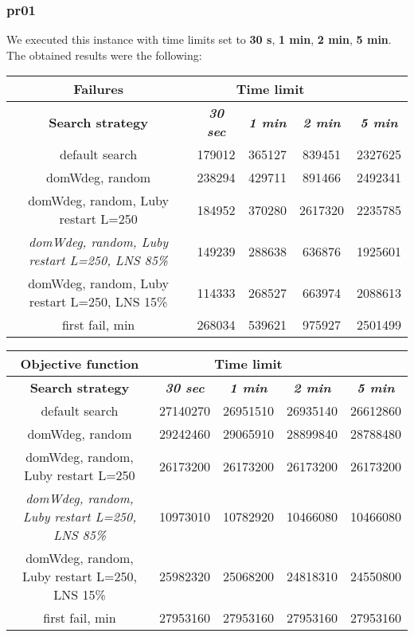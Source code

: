 \subsubsection{pr01}
We executed this instance with time limits set to \textbf{30 s}, \textbf{1 min}, \textbf{2 min}, \textbf{5 min}.\\
The obtained results were the following:
{
\renewcommand{\arraystretch}{2}
\begin{longtable}[h]{| c | c | c | c | c |}
    \hline
    \textbf{Failures} & \multicolumn{3}{c}{Time limit} & \\
    \hline
    \textbf{Search strategy} & \textbf{\textit{30 sec}} & \textbf{\textit{1 min}} & \textbf{\textit{2 min}} & \textbf{\textit{5 min}} \\
    \hline
    \endhead
    default search                                         & 179012 & 365127 &  839451 & 2327625 \\
    \hline
    domWdeg, random                                        & 238294 & 429711 &  891466 & 2492341 \\
    \hline
    domWdeg, random, Luby restart L=250                    & 184952 & 370280 & 2617320 & 2235785 \\
    \hline
    \textit{domWdeg, random, Luby restart L=250, LNS 85\%} & 149239 & 288638 &  636876 & 1925601 \\
    \hline
    domWdeg, random, Luby restart L=250, LNS 15\%          & 114333 & 268527 &  663974 & 2088613 \\
    \hline
    first fail, min                                        & 268034 & 539621 &  975927 & 2501499 \\
    \hline
\end{longtable}
}

{
\renewcommand{\arraystretch}{2}
\begin{longtable}[h]{| c | c | c | c | c |}
    \hline
    \textbf{Objective function} & \multicolumn{3}{c}{Time limit} & \\
    \hline
    \textbf{Search strategy} & \textbf{\textit{30 sec}} & \textbf{\textit{1 min}} & \textbf{\textit{2 min}} & \textbf{\textit{5 min}} \\
    \hline
    \endhead
    default search                                         & 27140270 & 26951510 & 26935140 & 26612860 \\
    \hline
    domWdeg, random                                        & 29242460 & 29065910 & 28899840 & 28788480 \\
    \hline
    domWdeg, random, Luby restart L=250                    & 26173200 & 26173200 & 26173200 & 26173200 \\
    \hline
    \textit{domWdeg, random, Luby restart L=250, LNS 85\%} & 10973010 & 10782920 & 10466080 & 10466080 \\
    \hline
    domWdeg, random, Luby restart L=250, LNS 15\%          & 25982320 & 25068200 & 24818310 & 24550800 \\
    \hline
    first fail, min                                        & 27953160 & 27953160 & 27953160 & 27953160 \\
    \hline
\end{longtable}
}